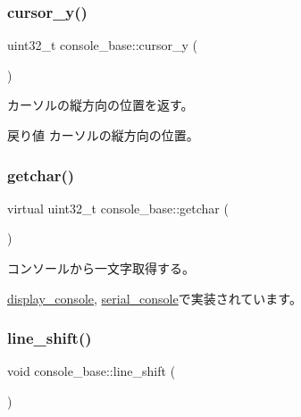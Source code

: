 \subsubsection{\texorpdfstring{cursor\+\_\+y()}{cursor\_y()}\hspace{0.1cm}{\footnotesize\ttfamily [2/2]}}
{\footnotesize\ttfamily uint32\+\_\+t console\+\_\+base\+::cursor\+\_\+y (\begin{DoxyParamCaption}{ }\end{DoxyParamCaption})}

カーソルの縦方向の位置を返す。 \begin{DoxyReturn}{戻り値}
カーソルの縦方向の位置。 
\end{DoxyReturn}
\hypertarget{classconsole__base_ab06fe008a39c09c60e427946f486833e}{}\label{classconsole__base_ab06fe008a39c09c60e427946f486833e} 
\subsubsection{\texorpdfstring{getchar()}{getchar()}}
{\footnotesize\ttfamily virtual uint32\+\_\+t console\+\_\+base\+::getchar (\begin{DoxyParamCaption}{ }\end{DoxyParamCaption})\hspace{0.3cm}{\ttfamily [pure virtual]}}

コンソールから一文字取得する。 

\hyperlink{classdisplay__console_aca457aab1c95f8fe79b428f9e5b43a51}{display\+\_\+console}, \hyperlink{classserial__console_a63393073ee917b8d5ecd04922e8b0219}{serial\+\_\+console}で実装されています。

\hypertarget{classconsole__base_ace51a1b9c9e3354c98622f7c122eb566}{}\label{classconsole__base_ace51a1b9c9e3354c98622f7c122eb566} 
\subsubsection{\texorpdfstring{line\+\_\+shift()}{line\_shift()}}
{\footnotesize\ttfamily void console\+\_\+base\+::line\+\_\+shift (\begin{DoxyParamCaption}{ }\end{DoxyParamCaption})}

